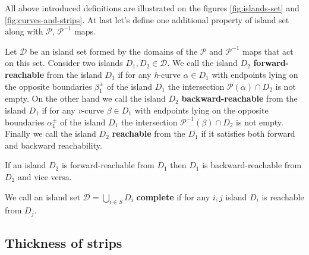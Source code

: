 All above introduced definitions are illustrated on the figures \ref{fig:islands-set} and \ref{fig:curves-and-strips}.
At last let's define one additional property of island set along with $\mathcal{P}$, $\mathcal{P}^{-1}$ maps.

\begin{definition}
	Let $\mathcal{D}$ be an island set formed by the domains of the $\mathcal{P}$ and $\mathcal{P}^{-1}$ maps that act on this set.
	Consider two islands $D_1, D_2 \in \mathcal{D}$.
	We call the island $D_2$ {\bf forward-reachable} from the island $D_1$ if for any \emph{h}-curve $\alpha \in D_1$ with endpoints lying on the opposite boundaries $\beta_1^{\pm}$ of the island $D_1$ the intersection $\mathcal{P}(\alpha) \cap D_2$ is not empty.
	On the other hand we call the island $D_2$ {\bf backward-reachable} from the island $D_1$ if for any \emph{v}-curve $\beta \in D_1$ with endpoints lying on the opposite boundaries $\alpha_1^{\pm}$ of the island $D_1$ the intersection $\mathcal{P}^{-1}(\beta) \cap D_2$ is not empty.
	Finally we call the island $D_2$ {\bf reachable} from the $D_1$ if it satisfies both forward and backward reachability.
\end{definition}

\begin{remark}
	If an island $D_2$ is forward-reachable from $D_1$ then $D_1$ is backward-reachable from $D_2$ and vice versa.
\end{remark}

\begin{definition}
	We call an island set $\mathcal{D} = \bigcup_{i \in S} D_i$ {\bf complete} if for any $i, j$ island $D_i$ is reachable from $D_j$.
\end{definition}

\subsection{Thickness of strips}

